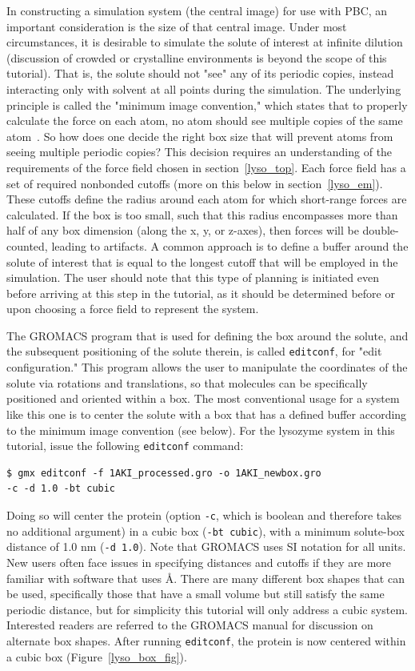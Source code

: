 \documentclass[9pt,tutorial]{livecoms}
\begin{document}
In constructing a simulation system (the central image) for use with PBC, an important consideration is the size of that central image. Under most circumstances, it is desirable to simulate the solute of interest at infinite dilution (discussion of crowded or crystalline environments is beyond the scope of this tutorial). That is, the solute should not "see" any of its periodic copies, instead interacting only with solvent at all points during the simulation. The underlying principle is called the "minimum image convention," which states that to properly calculate the force on each atom, no atom should see multiple copies of the same atom~\cite{Frenkel2001}. So how does one decide the right box size that will prevent atoms from seeing multiple periodic copies? This decision requires an understanding of the requirements of the force field chosen in section~\ref{lyso_top}. Each force field has a set of required nonbonded cutoffs (more on this below in section~\ref{lyso_em}). These cutoffs define the radius around each atom for which short-range forces are calculated. If the box is too small, such that this radius encompasses more than half of any box dimension (along the x, y, or z-axes), then forces will be double-counted, leading to artifacts. A common approach is to define a buffer around the solute of interest that is equal to the longest cutoff that will be employed in the simulation. The user should note that this type of planning is initiated even before arriving at this step in the tutorial, as it should be determined before or upon choosing a force field to represent the system.

The GROMACS program that is used for defining the box around the solute, and the subsequent positioning of the solute therein, is called \texttt{editconf}, for "edit configuration." This program allows the user to manipulate the coordinates of the solute via rotations and translations, so that molecules can be specifically positioned and oriented within a box. The most conventional usage for a system like this one is to center the solute with a box that has a defined buffer according to the minimum image convention (see below). For the lysozyme system in this tutorial, issue the following \texttt{editconf} command:

\begin{verbatim}
$ gmx editconf -f 1AKI_processed.gro -o 1AKI_newbox.gro 
-c -d 1.0 -bt cubic
\end{verbatim}

Doing so will center the protein (option \texttt{-c}, which is boolean and therefore takes no additional argument) in a cubic box (\texttt{-bt cubic}), with a minimum solute-box distance of 1.0 nm (\texttt{-d 1.0}). Note that GROMACS uses SI notation for all units. New users often face issues in specifying distances and cutoffs if they are more familiar with software that uses \AA. There are many different box shapes that can be used, specifically those that have a small volume but still satisfy the same periodic distance, but for simplicity this tutorial will only address a cubic system. Interested readers are referred to the GROMACS manual for discussion on alternate box shapes. After running \texttt{editconf}, the protein is now centered within a cubic box (Figure~\ref{lyso_box_fig}).
\end{document}
